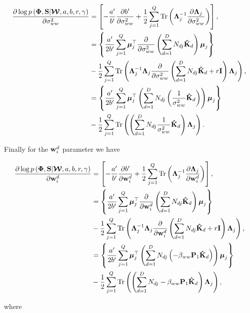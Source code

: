 	\begin{align}
	\frac{\partial \log p\left(\boldsymbol{\Phi},\mathbf{S}|\boldsymbol{\mathcal{W}},a,b,r,\gamma\right)}{\partial \sigma^2_{ww}} &= \left[-\frac{a'}{b'}\frac{\partial b'}{\partial\sigma^2_{ww}} + \frac{1}{2}\sum_{j=1}^{Q} \operatorname{Tr}\left(\boldsymbol{\Lambda}_j^{-1}\frac{\partial \boldsymbol{\Lambda}_j}{\partial \sigma^2_{ww}}\right)\right], \\
	& =  \left\{\frac{a'}{2b'}\sum\limits_{j=1}^{Q}\boldsymbol{\mu}_j^\top \frac{\partial }{\partial \sigma^2_{ww}}\left(\sum\limits_{d=1}^{D}{N_{dj}\mathbf{\hat{K}}_d}\right)\boldsymbol{\mu}_j\right\} \\
	&-\frac{1}{2}\sum_{j=1}^{Q} \operatorname{Tr}\left(\boldsymbol{\Lambda}_j^{-1}\boldsymbol{\Lambda}_j \frac{\partial }{\partial \sigma^2_{ww}}\left(\sum\limits_{d=1}^{D}{N_{dj}\mathbf{\hat{K}}_d+r\mathbf{I}}\right)\boldsymbol{\Lambda}_j\right),\\
	& =  \left\{\frac{a'}{2b'}\sum\limits_{j=1}^{Q}\boldsymbol{\mu}_j^\top \left(\sum\limits_{d=1}^{D}{N_{dj}\left(\frac{1}{\sigma^2_{ww}}\mathbf{\hat{K}}_d\right)}\right)\boldsymbol{\mu}_j\right\} \\
	&-\frac{1}{2}\sum_{j=1}^{Q} \operatorname{Tr}\left( \left(\sum\limits_{d=1}^{D}{N_{dj}
		\frac{1}{\sigma^2_{ww}}\mathbf{\hat{K}}_d}\right)\boldsymbol{\Lambda}_j\right).
	\end{align}
	
	Finally for the $\mathbf{w}_{i}^d$ parameter we have
	
	\begin{align}
	\frac{\partial \log p\left(\boldsymbol{\Phi},\mathbf{S}|\boldsymbol{\mathcal{W}},a,b,r,\gamma\right)}{\partial \mathbf{w}_{i}^d} &= \left[-\frac{a'}{b'}\frac{\partial b'}{\partial\mathbf{w}_{i}^d} + \frac{1}{2}\sum_{j=1}^{Q} \operatorname{Tr}\left(\boldsymbol{\Lambda}_j^{-1}\frac{\partial \boldsymbol{\Lambda}_j}{\partial \mathbf{w}_{i}^d}\right)\right], \\
	& =  \left\{\frac{a'}{2b'}\sum\limits_{j=1}^{Q}\boldsymbol{\mu}_j^\top \frac{\partial }{\partial \mathbf{w}_{i}^d}\left(\sum\limits_{d=1}^{D}{N_{dj}\mathbf{\hat{K}}_d}\right)\boldsymbol{\mu}_j\right\} \\
	&-\frac{1}{2}\sum_{j=1}^{Q} \operatorname{Tr}\left(\boldsymbol{\Lambda}_j^{-1}\boldsymbol{\Lambda}_j \frac{\partial }{\partial \mathbf{w}_{i}^d}\left(\sum\limits_{d=1}^{D}{N_{dj}\mathbf{\hat{K}}_d+r\mathbf{I}}\right)\boldsymbol{\Lambda}_j\right),\\
	& =  \left\{\frac{a'}{2b'}\sum\limits_{j=1}^{Q}\boldsymbol{\mu}_j^\top \left(\sum\limits_{d=1}^{D}{N_{dj}\left(-\beta_{ww}\mathbf{P}_1\mathbf{\hat{K}}_d\right)}\right)\boldsymbol{\mu}_j\right\} \\
	&-\frac{1}{2}\sum_{j=1}^{Q} \operatorname{Tr}\left( \left(\sum\limits_{d=1}^{D}{N_{dj}
		-\beta_{ww}\mathbf{P}_1\mathbf{\hat{K}}_d}\right)\boldsymbol{\Lambda}_j\right),
	\end{align}
	
	where 
